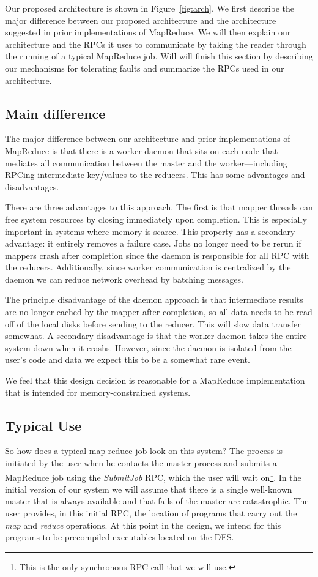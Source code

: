 \documentclass[10pt,letter,final,article,twocolumn]{article} %
\newcommand{\rpc}[1]{\emph{#1}}
\begin{document}
Our proposed architecture is shown in Figure~\ref{fig:arch}. We first describe the major difference between our proposed architecture and the architecture suggested in prior implementations of MapReduce. We will then explain our architecture and the RPCs it uses to communicate by taking the reader through the running of a typical MapReduce job. Will will finish this section by describing our mechanisms for tolerating faults and summarize the RPCs used in our architecture.

\subsection{Main difference}

The major difference between our architecture and prior implementations of MapReduce is that there is a worker daemon that sits on each node that mediates all communication between the master and the worker---including RPCing intermediate key/values to the reducers. This has some advantages and disadvantages.

There are three advantages to this approach. The first is that mapper threads can free system resources by closing immediately upon completion. This is especially important in systems where memory is scarce. This property has a secondary advantage: it entirely removes a failure case. Jobs no longer need to be rerun if mappers crash after completion since the daemon is responsible for all RPC with the reducers. Additionally, since worker communication is centralized by the daemon we can reduce network overhead by batching messages.

The principle disadvantage of the daemon approach is that intermediate results are no longer cached by the mapper after completion, so all data needs to be read off of the local disks before sending to the reducer. This will slow data transfer somewhat. A secondary disadvantage is that the worker daemon takes the entire system down when it crashs. However, since the daemon is isolated from the user's code and data we expect this to be a somewhat rare event.

We feel that this design decision is reasonable for a MapReduce implementation that is intended for memory-constrained systems.

\subsection{Typical Use}

So how does a typical map reduce job look on this system? The process is initiated by the user when he contacts the master process and submits a MapReduce job using the \rpc{SubmitJob} RPC, which the user will wait on\footnote{This is the only synchronous RPC call  that we will use.}. In the initial version of our system we will assume that there is a single well-known master that is always available and that fails of the master are catastrophic. The user provides, in this initial RPC, the location of programs that carry out the \emph{map} and \emph{reduce} operations. At this point in the design, we intend for this programs to be precompiled executables located on the DFS.
\end{document}
